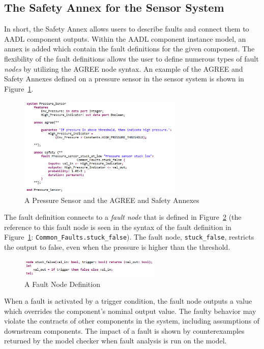 \subsection{The Safety Annex for the Sensor System}
In short, the Safety Annex allows users to describe faults and connect them to AADL component outputs. Within the AADL component instance model, an annex is added which contain the fault definitions for the given component. The flexibility of the fault definitions allows the user to define numerous types of fault \textit{nodes} by utilizing the AGREE node syntax. An example of the AGREE and Safety Annexes defined on a pressure sensor in the sensor system is shown in Figure~\ref{fig:annexes}. 
\begin{figure}[h]
	\centering
	\includegraphics[width=0.7\textwidth]{images/sensorAnnexes.PNG}
	\caption{A Pressure Sensor and the AGREE and Safety Annexes}
	\label{fig:annexes}
\end{figure}
The fault definition connects to a \textit{fault node} that is defined in Figure~\ref{fig:node} (the reference to this fault node is seen in the syntax of the fault definition in Figure~\ref{fig:annexes}: \texttt{Common\_Faults.stuck\_false}). The fault node, \texttt{stuck\_false}, restricts the output to false, even when the pressure is higher than the threshold.
\begin{figure}[h]
	\centering
	\includegraphics[width=0.6\textwidth]{images/sensorNode.PNG}
	\caption{A Fault Node Definition}
	\label{fig:node}
\end{figure}

When a fault is activated by a trigger condition, the fault node outputs a value which overrides the component's nominal output value. The faulty behavior may violate the contracts of other components in the system, including assumptions of downstream components. The impact of a fault is shown by counterexamples returned by the model checker when fault analysis is run on the model.

